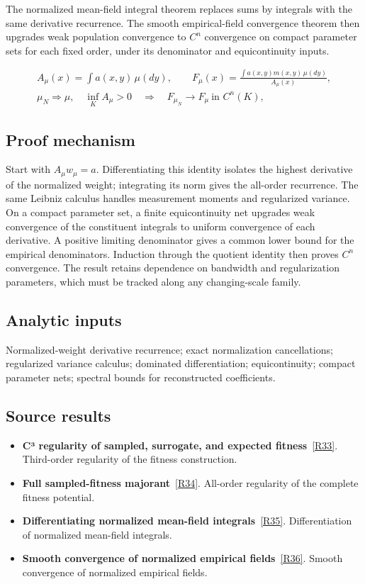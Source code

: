 \documentclass[11pt,a4paper]{article}
\begin{document}
The normalized mean-field integral theorem replaces sums by integrals with the same derivative recurrence. The smooth empirical-field convergence theorem then upgrades weak population convergence to \(C^n\) convergence on compact parameter sets for each fixed order, under its denominator and equicontinuity inputs.


\begin{gather*}
A_\mu(x)=\int a(x,y)\,\mu(dy),\qquad
F_\mu(x)=\frac{\int a(x,y)m(x,y)\,\mu(dy)}{A_\mu(x)},\\
\mu_N\Rightarrow\mu,\quad \inf_K A_\mu>0
\quad\Longrightarrow\quad F_{\mu_N}\longrightarrow F_\mu\ \text{in }C^n(K),
\end{gather*}
\subsection*{Proof mechanism}
Start with \(A_\mu w_\mu=a\). Differentiating this identity isolates the highest derivative of the normalized weight; integrating its norm gives the all-order recurrence. The same Leibniz calculus handles measurement moments and regularized variance. On a compact parameter set, a finite equicontinuity net upgrades weak convergence of the constituent integrals to uniform convergence of each derivative. A positive limiting denominator gives a common lower bound for the empirical denominators. Induction through the quotient identity then proves \(C^n\) convergence. The result retains dependence on bandwidth and regularization parameters, which must be tracked along any changing-scale family.
\subsection*{Analytic inputs}
Normalized-weight derivative recurrence; exact normalization cancellations; regularized variance calculus; dominated differentiation; equicontinuity; compact parameter nets; spectral bounds for reconstructed coefficients.
\subsection*{Source results}
\begin{itemize}
\item \textbf{C³ regularity of sampled, surrogate, and expected fitness}~\hyperref[src:thm-c3-regularity]{[R33]}. Third-order regularity of the fitness construction.
\item \textbf{Full sampled-fitness majorant}~\hyperref[src:thm-main-cinf-regularity-fitness-potential-full]{[R34]}. All-order regularity of the complete fitness potential.
\item \textbf{Differentiating normalized mean-field integrals}~\hyperref[src:thm-cinf-mean-field-integrals]{[R35]}. Differentiation of normalized mean-field integrals.
\item \textbf{Smooth convergence of normalized empirical fields}~\hyperref[src:thm-cinf-empirical-field-convergence]{[R36]}. Smooth convergence of normalized empirical fields.
\end{itemize}
\end{document}
